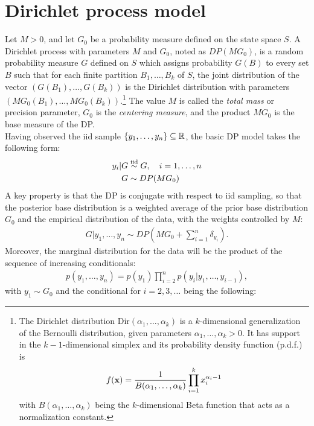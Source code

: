 \section{Dirichlet process model}
Let $M>0$, and let $G_0$ be a probability measure defined on the state space $S$.
A Dirichlet process with parameters $M$ and $G_0$, noted as $DP(M G_0)$, is a random probability measure $G$ defined on $S$ which assigns probability $G(B)$ to every set $B$ such that for each finite partition ${B_1,\dots,B_k}$ of $S$, the joint distribution of the  vector $(G(B_1),\dots,G(B_k))$ is the Dirichlet distribution with parameters $(MG_0(B_1),\dots,MG_0(B_k))$.\footnote{The Dirichlet distribution $\text{Dir}(\alpha_1, \dots, \alpha_k)$ is a $k$-dimensional generalization of the Bernoulli distribution, given parameters $\alpha_1,\dots,\alpha_k > 0$.
It has support in the $k-1$-dimensional simplex and its probability density function (p.d.f.) is
$$f(\textbf x) = \frac{1}{B(\alpha_1, \dots, \alpha_k)} \prod_{i=1}^k x_i^{\alpha_i-1}$$
with $B(\alpha_1, \dots, \alpha_k)$ being the $k$-dimensional Beta function that acts as a normalization constant.}
The value $M$ is called the \emph{total mass} or precision parameter, $G_0$ is the \emph{centering measure}, and the product $MG_0$ is the base measure of the DP. \\
Having observed the iid sample $\{y_1,\dots,y_n\} \subseteq \mathbb R$, the basic DP model takes the following form:
\begin{equation}\label{dpm}
	\begin{aligned}
	y_i | G &\stackrel{\text{iid}}{\sim} G, \quad i=1,\dots,n \\
	G &\sim DP(MG_0)
	\end{aligned}
\end{equation}
A key property is that the DP is conjugate with respect to iid sampling, so that the posterior base distribution is a weighted average of the prior base distribution $G_0$ and the empirical distribution of the data, with the weights controlled by $M$:
\begin{align}\label{dp-posterior}
	G | y_1,\dots,y_n \sim DP\left(M G_0 + \sum_{i=1}^n \delta_{y_i}\right).
\end{align}
Moreover, the marginal distribution for the data will be the product of the sequence of increasing conditionals:
\begin{align*}
	p(y_1,\dots,y_n)= p(y_1)\prod\limits_{i=2}^{n} p(y_i|y_1,\dots,y_{i-1}),
\end{align*}
with $y_1 \sim G_0$ and the conditional for $i=2,3,\dots$ being the following:
